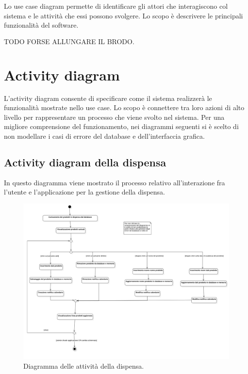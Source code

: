 Lo use case diagram permette di identificare gli attori che interagiscono col sistema e le attività che essi possono svolgere. Lo scopo è descrivere le principali funzionalità del software.

TODO FORSE ALLUNGARE IL BRODO.

\newpage

\section{Activity diagram}

L'activity diagram consente di specificare come il sistema realizzerà le funzionalità mostrate nello use case. Lo scopo è connettere tra loro azioni di alto livello per rappresentare un processo che viene svolto nel sistema. Per una migliore comprensione del funzionamento, nei diagrammi seguenti si è scelto di non modellare i casi di errore del database e dell'interfaccia grafica. 

\subsection{Activity diagram della dispensa}

In questo diagramma viene mostrato il processo relativo all'interazione fra l'utente e l'applicazione per la gestione della dispensa. 

\begin{figure}[H]
    \includegraphics[width=\linewidth]{images/activity-pantry.png}
    \caption{Diagramma delle attività della dispensa.}
    \label{fig:actpantry}
\end{figure}

